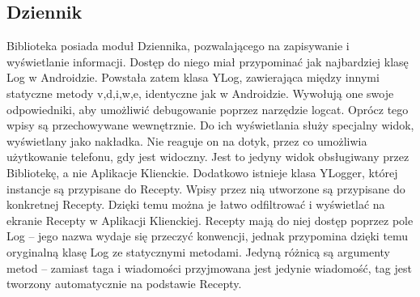 \documentclass[11pt,a4paper,polish,thesis]{dcsbook}
\begin{document}
\subsection{Dziennik}
Biblioteka posiada moduł Dziennika, pozwalającego na zapisywanie i wyświetlanie informacji. Dostęp do niego miał przypominać jak najbardziej klasę Log \cite{android.log} w Androidzie. Powstała zatem klasa YLog, zawierająca między innymi statyczne metody v,d,i,w,e, identyczne jak w Androidzie. Wywołują one swoje odpowiedniki, aby umożliwić debugowanie poprzez narzędzie logcat. Oprócz tego wpisy są przechowywane wewnętrznie.
Do ich wyświetlania służy specjalny widok, wyświetlany jako nakładka. Nie reaguje on na dotyk, przez co umożliwia użytkowanie telefonu, gdy jest widoczny. Jest to jedyny widok obsługiwany przez Bibliotekę, a nie Aplikacje Klienckie.
Dodatkowo istnieje klasa YLogger, której instancje są przypisane do Recepty. Wpisy przez nią utworzone są przypisane do konkretnej Recepty. Dzięki temu można je łatwo odfiltrować i wyświetlać na ekranie Recepty w Aplikacji Klienckiej. 
Recepty mają do niej dostęp poprzez pole Log -- jego nazwa wydaje się przeczyć konwencji, jednak przypomina dzięki temu oryginalną klasę Log ze statycznymi metodami. Jedyną różnicą są argumenty metod -- zamiast taga i wiadomości przyjmowana jest jedynie wiadomość, tag jest tworzony automatycznie na podstawie Recepty.
\end{document}
